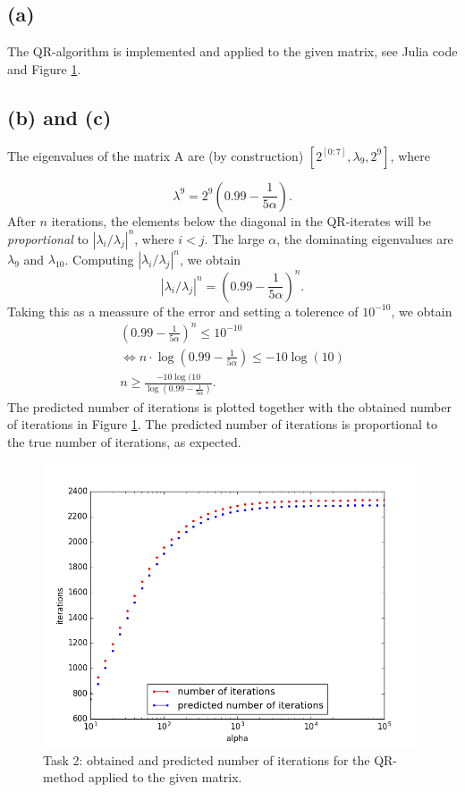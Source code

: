 \subsection*{(a)}
The QR-algorithm is implemented and applied to the given matrix, see Julia code and Figure  \ref{task2}. 

\subsection*{(b) and (c)}
The eigenvalues of the matrix A are (by construction) $[2^{[0:7]}, \lambda_9, 2^9]$, 
where

\begin{equation}
\lambda^{9} = 2^9\left(0.99-\frac{1}{5\alpha}\right).
\end{equation}
After $n$ iterations, the elements below the diagonal in the QR-iterates will be \emph{proportional} to $|\lambda_i/\lambda_j|^n$, where $i<j$. The large $\alpha$, the dominating eigenvalues are $\lambda_9$ and $\lambda_10$. Computing $|\lambda_i/\lambda_j|^n$, we obtain 
\begin{equation}
|\lambda_i/\lambda_j|^n = \left(0.99-\frac{1}{5\alpha}\right)^n.
\end{equation}
Taking this as a meassure of the error and setting a tolerence of $10^{-10}$, we obtain
\begin{equation}
\begin{aligned}
\left(0.99-\frac{1}{5\alpha}\right)^n\leq 10^{-10}\\
\Leftrightarrow
n\cdot\log(0.99-\frac{1}{5\alpha})\leq -10 \log(10)\\
n\geq \frac{-10\log(10}{\log(0.99-\frac{1}{5\alpha})}.
\end{aligned}
\end{equation}
The  predicted number of iterations is plotted together with the obtained number of iterations in Figure \ref{task2}. The predicted number of iterations is proportional to the true number of iterations, as expected.

\begin{figure}[h!]
\centering
\includegraphics[scale=0.6]{alpha.png}
\caption{Task 2: obtained and predicted number of iterations for the QR-method applied to the given matrix.}
\label{task2}
\end{figure}